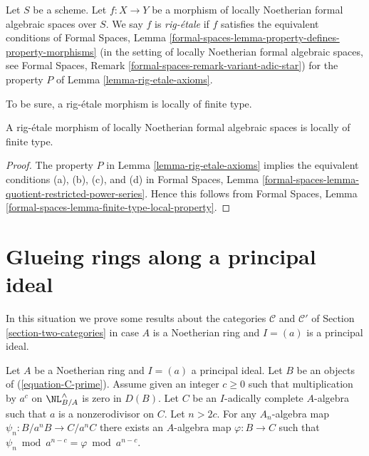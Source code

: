 \begin{definition}
\label{definition-rig-etale}
Let $S$ be a scheme. Let $f : X \to Y$ be a morphism of locally
Noetherian formal algebraic spaces over $S$. We say $f$ is
{\it rig-\'etale} if $f$ satisfies the equivalent conditions of
Formal Spaces, Lemma
\ref{formal-spaces-lemma-property-defines-property-morphisms}
(in the setting of locally Noetherian formal algebraic spaces, see
Formal Spaces, Remark \ref{formal-spaces-remark-variant-adic-star})
for the property $P$ of Lemma \ref{lemma-rig-etale-axioms}.
\end{definition}

\noindent
To be sure, a rig-\'etale morphism is locally of finite type.

\begin{lemma}
\label{lemma-rig-etale-finite-type}
A rig-\'etale morphism of locally Noetherian formal algebraic spaces
is locally of finite type.
\end{lemma}

\begin{proof}
The property $P$ in Lemma \ref{lemma-rig-etale-axioms}
implies the equivalent conditions (a), (b), (c), and (d) in
Formal Spaces, Lemma
\ref{formal-spaces-lemma-quotient-restricted-power-series}.
Hence this follows from
Formal Spaces, Lemma \ref{formal-spaces-lemma-finite-type-local-property}.
\end{proof}








\section{Glueing rings along a principal ideal}
\label{section-approximation-principal}

\noindent
In this situation we prove some results about the categories
$\mathcal{C}$ and $\mathcal{C}'$ of
Section \ref{section-two-categories}
in case $A$ is a Noetherian ring and $I = (a)$ is a principal
ideal.

\begin{lemma}
\label{lemma-get-morphism-nonzerodivisor}
Let $A$ be a Noetherian ring and $I = (a)$ a principal ideal.
Let $B$ be an objects of (\ref{equation-C-prime}).
Assume given an integer $c \geq 0$ such that
multiplication by $a^c$ on $\NL_{B/A}^\wedge$ is zero in $D(B)$.
Let $C$ be an $I$-adically complete $A$-algebra such that
$a$ is a nonzerodivisor on $C$. Let $n > 2c$. For any $A_n$-algebra
map $\psi_n : B/a^nB \to C/a^nC$ there exists an $A$-algebra
map $\varphi : B \to C$ such that
$\psi_n \bmod a^{n - c} = \varphi \bmod a^{n - c}$.
\end{lemma}

